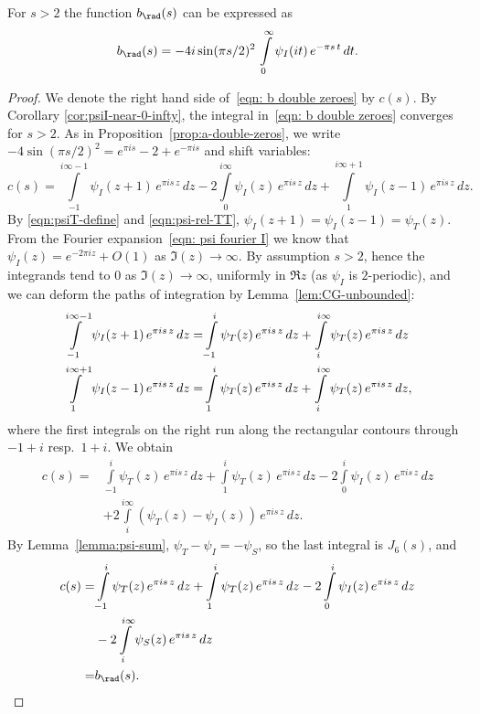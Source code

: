 \begin{proposition}\label{prop:b-double-zeros}\leanok
For $s>2$ the function $b_\rad(s)$ can be expressed as
\begin{equation}\label{eqn: b double zeroes}
    b_\rad(s)=-4i\sin(\pi s/2)^2\,\int\limits_{0}^{\infty}\psi_I(it)\,e^{-\pi s \,t}\,dt.
\end{equation}
\end{proposition}
\begin{proof}
We denote the right hand side of~\eqref{eqn: b double zeroes} by $c(s)$.
By Corollary \ref{cor:psiI-near-0-infty}, the integral in~\eqref{eqn: b double zeroes} converges for $s>2$.
As in Proposition~\ref{prop:a-double-zeros}, we write $-4\sin(\pi s/2)^2 = e^{\pi i s} - 2 + e^{-\pi i s}$ and shift variables:
$$c(s)=\int\limits_{-1}^{i\infty-1}\psi_I(z+1)\,e^{\pi i s \,z}\,dz-2\int\limits_{0}^{i\infty}\psi_I(z)\,e^{\pi i s \,z}\,dz+
\int\limits_{1}^{i\infty+1}\psi_I(z-1)\,e^{\pi i s \,z}\,dz.$$
By \eqref{eqn:psiT-define} and \eqref{eqn:psi-rel-TT}, $\psi_I(z+1) = \psi_I(z - 1) = \psi_T(z)$.
From the Fourier expansion~\eqref{eqn: psi fourier I} we know that $\psi_I(z)=e^{-2\pi i z}+O(1)$ as $\Im(z)\to\infty$.
By assumption $s>2$, hence the integrands tend to $0$ as $\Im(z) \to \infty$, uniformly in $\Re z$ (as $\psi_I$ is $2$-periodic), and we can deform the paths of integration by Lemma~\ref{lem:CG-unbounded}:
\begin{align}
\int\limits_{-1}^{i\infty-1}\psi_I(z+1)\,e^{\pi i s \,z}\,dz=&
\int\limits_{-1}^{i}\psi_T(z)\,e^{\pi i s \,z}\,dz+\int\limits_{i}^{i\infty}\psi_T(z)\,e^{\pi i s \,z}\,dz\label{eqn: inside proof 1}\\
\int\limits_{1}^{i\infty+1}\psi_I(z-1)\,e^{\pi i s \,z}\,dz=&
\int\limits_{1}^{i}\psi_T(z)\,e^{\pi i s \,z}\,dz+\int\limits_{i}^{i\infty}\psi_T(z)\,e^{\pi i s \,z}\,dz,\notag
\end{align}
where the first integrals on the right run along the rectangular contours through $-1 + i$ resp.\ $1 + i$. We obtain
\begin{align}\label{eqn: c1}c(s)=&\int\limits_{-1}^{i}\psi_T(z)\,e^{\pi i s \,z}\,dz+\int\limits_{1}^{i}\psi_T(z)\,e^{\pi i s \,z}\,dz
-2\int\limits_{0}^{i}\psi_I(z)\,e^{\pi i s \,z}\,dz\\
&+2\int\limits_{i}^{i\infty}(\psi_T(z)-\psi_I(z))\,e^{\pi i s \,z}\,dz.\nonumber
    \end{align}
By Lemma~\ref{lemma:psi-sum}, $\psi_T - \psi_I = -\psi_S$, so the last integral is $J_6(s)$, and
\begin{align}c(s)=&\int\limits_{-1}^{i}\psi_T(z)\,e^{\pi i s \,z}\,dz+\int\limits_{1}^{i}\psi_T(z)\,e^{\pi i s \,z}\,dz
-2\int\limits_{0}^{i}\psi_I(z)\,e^{\pi i s \,z}\,dz\notag\\
&-2\int\limits_{i}^{i\infty}\psi_S(z)\,e^{\pi i s \,z}\,dz\notag\\
=&b_\rad(s).\notag
    \end{align}
\end{proof}
